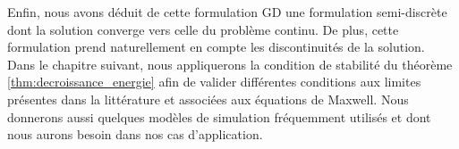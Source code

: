 Enfin, nous avons déduit de cette formulation GD une formulation semi-discrète dont la solution converge vers celle du problème continu.
De plus, cette formulation prend naturellement en compte les discontinuités de la solution.
\\

Dans le chapitre suivant, nous appliquerons la condition de stabilité du théorème \ref{thm:decroissance_energie}
afin de valider différentes conditions aux limites présentes dans
la littérature et associées aux équations de Maxwell.
Nous donnerons aussi quelques modèles de simulation
fréquemment utilisés et dont nous aurons besoin dans nos cas d'application.


